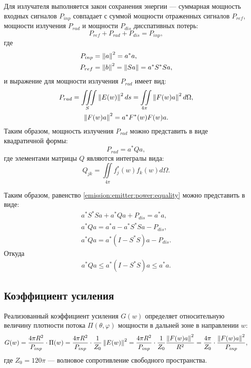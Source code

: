 Для излучателя выполняется закон сохранения энергии --- суммарная мощность входных сигналов $P_{inp}$ совпадает с суммой мощности отраженных сигналов $P_{ref}$,
мощности излучения $P_{rad}$ и мощности $P_{dis}$ дисспативных потерь:
\begin{equation}
    \label{emission:emitter:power:equality}
    P_{ref} + P_{rad} + P_{dis} = P_{inp} ,
\end{equation}
где
\begin{align}
    P_{inp} & = \left \| a \right \|^2 = a^* a , \label{emission:emitter:power:input}\\
    P_{ref} & = \left \| b \right \|^2 = \left \| S a \right \| = a^* S^* S a \notag,
\end{align}
и выражение для мощности излучения $P_{rad}$ имеет вид:
\begin{gather*}
    P_{rad}
    = \iiint \limits_S \left \| E(w) \right \|^2 ds
    = \iint \limits_{4 \pi} \left \| F(w) a \right \|^2 d \Omega , \\
    \left \| F(w) a \right \|^2
    = a^* F^*(w) F(w) a .
\end{gather*}
Таким образом, мощность излучения $P_{rad}$ можно представить в виде квадратичной формы:
\begin{equation}
    \label{emission:emitter:power:radiated}
    P_{rad}
    = a^* Q a ,
\end{equation}
где элементами матрицы $Q$ являются интегралы вида:
\[
    Q_{jk} = \iint \limits_{4 \pi} f_j^*(w) f_k(w) d \Omega .
\]

Таким образом, равенство \eqref{emission:emitter:power:equality} можно представить в виде:
\begin{gather*}
    a^* S^* S a + a^* Q a + P_{dis} = a^* a , \\
    a^* Q a = a^* a - a^* S^* S a - P_{dis}, \\
    a^* Q a = a^* ( I - S^* S ) a - P_{dis} .
\end{gather*}
Откуда
\begin{gather*}
    \label{emission:emitter:power:inequality}
    a^* Q a \le a^* ( I - S^* S ) a \le a^* a.
\end{gather*}


\subsection{Коэффициент усиления}

Реализованный коэффициент усиления $G(w)$ определяет относительную величину плотности потока $\Pi(\theta, \varphi)$ мощности в дальней зоне в
направлении $w$:
\[
    G(w)
    = \frac{4 \pi R^2}{P_{inp}} \cdot \Pi(w)
    = \frac{4 \pi R^2}{P_{inp}} \cdot \frac{1}{Z_0} \left \| E(w) \right \|^2
    = \frac{4 \pi R^2}{P_{inp}} \cdot \frac{1}{Z_0} \frac{\left \| F(w) a \right \|^2}{R^2}
    = \frac{4 \pi}{Z_0} \cdot \frac{\left \| F(w) a \right \|^2}{P_{inp}} ,
\]
где $Z_0 = 120 \pi$ --- волновое сопротивление свободного пространства.

